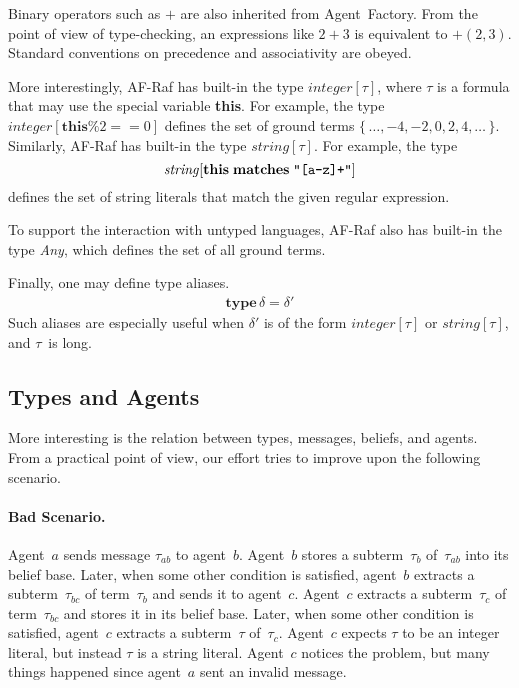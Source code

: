 \documentclass{aamas2012} %
\theoremstyle{remark}
\begin{document}
Binary operators such as $+$ are also inherited from Agent~Factory. From
the point of view of type-checking, an expressions like $2+3$ is equivalent
to $+(2,3)$. Standard conventions on precedence and associativity are
obeyed.

More interestingly, AF-Raf has built-in the type $\mathit{integer}[\tau]$,
where $\tau$ is a formula that may use the special variable \textbf{this}.
For example, the type $\mathit{integer}[\mathbf{this}\%2==0]$ defines the
set of ground terms $\{\,\ldots,-4,-2,0,2,4,\ldots\,\}$. Similarly, AF-Raf
has built-in the type $\mathit{string}[\tau]$. For example, the type
\[\mathit{string}[\mathbf{this}\;\mathbf{matches}\;\verb|"[a-z]+"|]\]
defines the set of string literals that match the given regular expression.

To support the interaction with untyped languages, AF-Raf also has built-in
the type \textit{Any}, which defines the set of all ground terms.

Finally, one may define type aliases.
\begin{align}
\mathbf{type}\,\delta=\delta'
\end{align}
Such aliases are especially useful when $\delta'$ is of the form
$\mathit{integer}[\tau]$ or $\mathit{string}[\tau]$, and $\tau$~is long.

\subsection{Types and Agents}

More interesting is the relation between types, messages, beliefs, and
agents. From a practical point of view, our effort tries to improve upon
the following scenario.

\paragraph{Bad Scenario.}

Agent~$a$ sends message $\tau_{ab}$ to agent~$b$. Agent~$b$ stores a
subterm~$\tau_b$ of~$\tau_{ab}$ into its belief base. Later, when some
other condition is satisfied, agent~$b$ extracts a subterm~$\tau_{bc}$ of
term~$\tau_b$ and sends it to agent~$c$. Agent~$c$ extracts a
subterm~$\tau_c$ of term~$\tau_{bc}$ and stores it in its belief base.
Later, when some other condition is satisfied, agent~$c$ extracts a
subterm~$\tau$ of~$\tau_c$. Agent~$c$ expects $\tau$ to be an integer
literal, but instead $\tau$ is a string literal. Agent~$c$ notices the
problem, but many things happened since agent~$a$ sent an invalid message.
\end{document}
